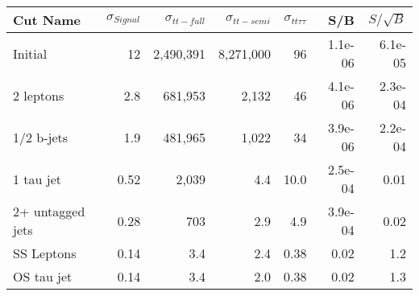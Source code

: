 \begin{tabular}{lrrrrrr}
\toprule
         Cut Name &  $\sigma_{Signal}$ &  $\sigma_{tt-full}$ &  $\sigma_{tt-semi}$ &  $\sigma_{tt\tau\tau}$ &     S/B &  $S/\sqrt{B}$ \\
\midrule
          Initial &                 12 &           2,490,391 &           8,271,000 &                     96 & 1.1e-06 &       6.1e-05 \\
        2 leptons &                2.8 &             681,953 &               2,132 &                     46 & 4.1e-06 &       2.3e-04 \\
       1/2 b-jets &                1.9 &             481,965 &               1,022 &                     34 & 3.9e-06 &       2.2e-04 \\
        1 tau jet &               0.52 &               2,039 &                 4.4 &                   10.0 & 2.5e-04 &          0.01 \\
 2+ untagged jets &               0.28 &                 703 &                 2.9 &                    4.9 & 3.9e-04 &          0.02 \\
       SS Leptons &               0.14 &                 3.4 &                 2.4 &                   0.38 &    0.02 &           1.2 \\
       OS tau jet &               0.14 &                 3.4 &                 2.0 &                   0.38 &    0.02 &           1.3 \\
\bottomrule
\end{tabular}
